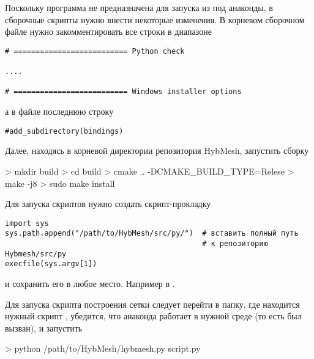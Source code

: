 Поскольку программа не предназначена для запуска из под анаконды,
в сборочные скрипты нужно внести некоторые изменения.
В корневом сборочном файле  
нужно закомментировать все строки в диапазоне
\begin{verbatim}
# ========================== Python check

....

# ========================== Windows installer options
\end{verbatim}
а в файле  последнюю строку
\begin{verbatim}
#add_subdirectory(bindings)
\end{verbatim}

Далее, находясь в корневой директории репозитория HybMesh, запустить сборку
\begin{shelloutput}
> mkdir build
> cd build
> cmake .. -DCMAKE_BUILD_TYPE=Relese
> make -j8
> sudo make install
\end{shelloutput}

Для запуска скриптов нужно создать скрипт-прокладку
\begin{verbatim}
import sys
sys.path.append("/path/to/HybMesh/src/py/")  # вставить полный путь
                                             # к репозиторию Hybmesh/src/py
execfile(sys.argv[1])
\end{verbatim}
и сохранить его в любое место. Например в .

Для запуска скрипта построения сетки следует перейти в папку, где находится нужный скрипт ,
убедится, что анаконда работает в нужной среде (то есть  был вызван),
и запустить
\begin{shelloutput}
> python /path/to/HybMesh/hybmesh.py script.py
\end{shelloutput}
